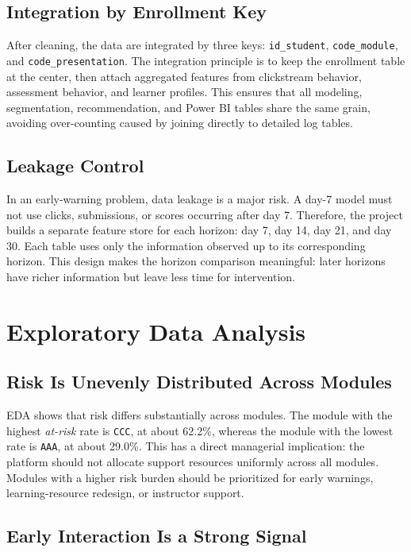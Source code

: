 \documentclass[conference]{IEEEtran}
\newcommand{\risk}{\textit{at-risk}}
\begin{document}
\subsection{Integration by Enrollment Key}

After cleaning, the data are integrated by three keys: \texttt{id\_student}, \texttt{code\_module}, and \texttt{code\_presentation}. The integration principle is to keep the enrollment table at the center, then attach aggregated features from clickstream behavior, assessment behavior, and learner profiles. This ensures that all modeling, segmentation, recommendation, and Power BI tables share the same grain, avoiding over-counting caused by joining directly to detailed log tables.

\subsection{Leakage Control}

In an early-warning problem, data leakage is a major risk. A day-7 model must not use clicks, submissions, or scores occurring after day 7. Therefore, the project builds a separate feature store for each horizon: day 7, day 14, day 21, and day 30. Each table uses only the information observed up to its corresponding horizon. This design makes the horizon comparison meaningful: later horizons have richer information but leave less time for intervention.

\section{Exploratory Data Analysis}

\subsection{Risk Is Unevenly Distributed Across Modules}

EDA shows that risk differs substantially across modules. The module with the highest \risk{} rate is \texttt{CCC}, at about 62.2\%, whereas the module with the lowest rate is \texttt{AAA}, at about 29.0\%. This has a direct managerial implication: the platform should not allocate support resources uniformly across all modules. Modules with a higher risk burden should be prioritized for early warnings, learning-resource redesign, or instructor support.

\subsection{Early Interaction Is a Strong Signal}
\end{document}
